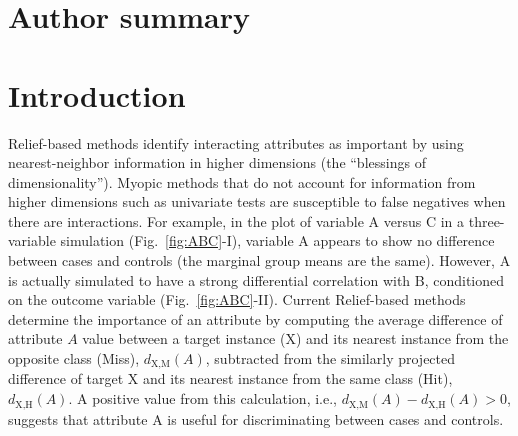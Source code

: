 \documentclass[10pt,letterpaper]{article}\usepackage[]{graphicx}\usepackage[]{color}
\begin{document}
\section*{Author summary}

\linenumbers

\section*{Introduction}

Relief-based methods identify interacting attributes as important by using nearest-neighbor information in higher dimensions (the ``blessings of dimensionality''). Myopic methods that do not account for information from higher dimensions such as univariate tests are susceptible to false negatives when there are interactions. For example, in the plot of variable A versus C in a three-variable simulation (Fig.~\ref{fig:ABC}-I), variable A appears to show no difference between cases and controls (the marginal group means are the same). However, A is actually simulated to have a strong differential correlation with B, conditioned on the outcome variable (Fig.~\ref{fig:ABC}-II). Current Relief-based methods determine the importance of an attribute by computing the average difference of attribute $A$ value between a target instance (X) and its nearest instance from the opposite class (Miss), $d_{\text{X,M}}(A)$, subtracted from the similarly projected difference of target X and its nearest instance from the same class (Hit), $d_{\text{X,H}}(A)$. A positive value from this calculation, i.e., $d_{\text{X,M}}(A)-d_{\text{X,H}}(A) > 0$, suggests that attribute A is useful for discriminating between cases and controls.  
\end{document}
